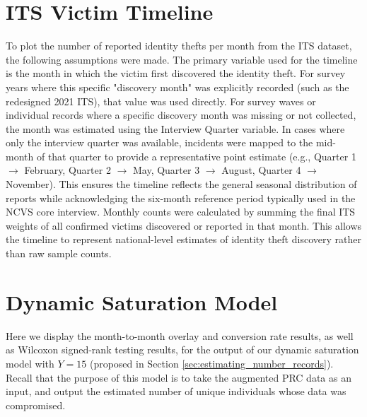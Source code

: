 \section{ITS Victim Timeline}
\label{app:timeline}
To plot the number of reported identity thefts per month from the ITS dataset, the following assumptions were made. The primary variable used for the timeline is the month in which the victim first discovered the identity theft. For survey years where this specific "discovery month" was explicitly recorded (such as the redesigned 2021 ITS), that value was used directly. For survey waves or individual records where a specific discovery month was missing or not collected, the month was estimated using the Interview Quarter variable. In cases where only the interview quarter was available, incidents were mapped to the mid-month of that quarter to provide a representative point estimate (e.g., Quarter 1 $\rightarrow$ February, Quarter 2 $\rightarrow$ May, Quarter 3 $\rightarrow$ August, Quarter 4 $\rightarrow$ November). This ensures the timeline reflects the general seasonal distribution of reports while acknowledging the six-month reference period typically used in the NCVS core interview. Monthly counts were calculated by summing the final ITS weights of all confirmed victims discovered or reported in that month. This allows the timeline to represent national-level estimates of identity theft discovery rather than raw sample counts.


\section{Dynamic Saturation Model}
\label{app:sat_model}
Here we display the month-to-month overlay and conversion rate results, as well as Wilcoxon signed-rank testing results, for the output of our dynamic saturation model with $Y=15$ (proposed in Section \ref{sec:estimating_number_records}). Recall that the purpose of this model is to take the augmented PRC data as an input, and output the estimated number of unique individuals whose data was compromised.

